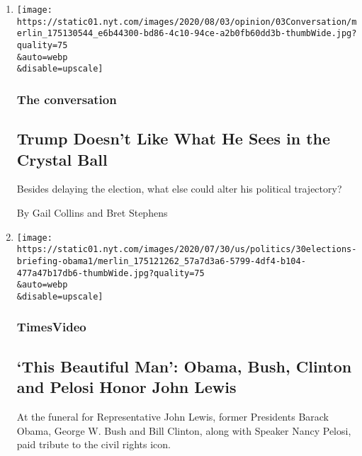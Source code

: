 \begin{enumerate}
\def\labelenumi{\arabic{enumi}.}
\item
  \href{/2020/08/03/opinion/trump-biden-2020.html}{}

  \texttt{[image: https://static01.nyt.com/images/2020/08/03/opinion/03Conversation/merlin\_175130544\_e6b44300-bd86-4c10-94ce-a2b0fb60dd3b-thumbWide.jpg?quality=75\\\&auto=webp\\\&disable=upscale]}

  \hypertarget{the-conversation}{%
  \subsubsection{The conversation}\label{the-conversation}}

  \hypertarget{trump-doesnt-like-what-he-sees-in-the-crystal-ball}{%
  \subsection{Trump Doesn't Like What He Sees in the Crystal
  Ball}\label{trump-doesnt-like-what-he-sees-in-the-crystal-ball}}

  Besides delaying the election, what else could alter his political
  trajectory?

  By Gail Collins and Bret Stephens
\item
  \href{/video/us/politics/100000007264823/john-lewis-funeral.html}{}

  \texttt{[image: https://static01.nyt.com/images/2020/07/30/us/politics/30elections-briefing-obama1/merlin\_175121262\_57a7d3a6-5799-4df4-b104-477a47b17db6-thumbWide.jpg?quality=75\\\&auto=webp\\\&disable=upscale]}

  \hypertarget{timesvideo}{%
  \subsubsection{TimesVideo}\label{timesvideo}}

  \hypertarget{this-beautiful-man-obama-bush-clinton-and-pelosi-honor-john-lewis}{%
  \subsection{`This Beautiful Man': Obama, Bush, Clinton and Pelosi
  Honor John
  Lewis}\label{this-beautiful-man-obama-bush-clinton-and-pelosi-honor-john-lewis}}

  At the funeral for Representative John Lewis, former Presidents Barack
  Obama, George W. Bush and Bill Clinton, along with Speaker Nancy
  Pelosi, paid tribute to the civil rights icon.


\end{enumerate}
